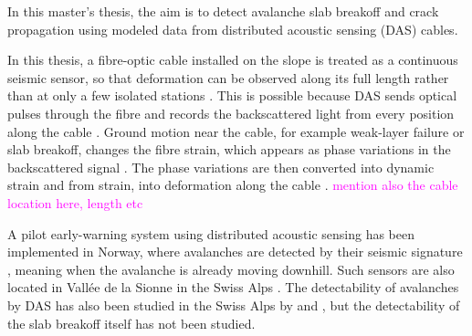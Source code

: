 \documentclass[10pt]{article}
\begin{document}
  
  In this master's thesis, the aim is to detect avalanche slab breakoff and crack propagation using modeled data from distributed acoustic sensing (DAS) cables. \par

  In this thesis, a fibre-optic cable installed on the slope is treated as a continuous seismic sensor, so that deformation can be observed along its full length rather than at only a few isolated stations \parencite{parkerDistributedAcousticSensing2014}. This is possible because DAS sends optical pulses through the fibre and records the backscattered light from every position along the cable \parencite{shatalinInterferometricOpticalTimedomain1998}. Ground motion near the cable, for example weak-layer failure or slab breakoff, changes the fibre strain, which appears as phase variations in the backscattered signal \parencite{hartogIntroductionDistributedOptical2017}. The phase variations are then converted into dynamic strain and from strain, into deformation along the cable \parencite{trabattoniStrainDisplacementUsing2023}. \textcolor{magenta}{mention also the cable location here, length etc} \par 

  
  A pilot early-warning system using distributed acoustic sensing has been implemented in Norway, where avalanches are detected by their seismic signature \parencite{turquetAutomatedSnowAvalanche2024}, meaning when the avalanche is already moving downhill. Such sensors are also located in Vallée de la Sionne in the Swiss Alps \parencite{paitzPhenomenologyAvalancheRecordings2023}. The detectability of avalanches by DAS has also been studied in the Swiss Alps by \cite{paitzPhenomenologyAvalancheRecordings2023} and \cite{edmeFiberopticDetectionSnow2023}, but the detectability of the slab breakoff itself has not been studied. 

  
  
\end{document}
